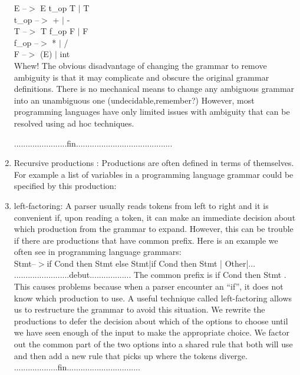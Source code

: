 \begin{enumerate}
E $–>$ E t\_op T $|$ T\\
t\_op $–>$ + $|$ -\\
T $–>$ T f\_op F $|$ F\\
f\_op $–>$ * $|$ /\\
F $–>$ (E) $|$ int\\

Whew! The obvious disadvantage of changing the grammar to remove ambiguity is that it may complicate and obscure the original grammar definitions. There is no mechanical means to change any ambiguous grammar into an unambiguous one (undecidable,remember?) However, most programming languages have only limited issues with
ambiguity that can be resolved using ad hoc techniques.

.......................fin..........................................


\item Recursive productions :
Productions are often defined in terms of themselves. For example a list of variables in a programming language grammar could be specified by this production:

\item left-factoring:  A parser usually reads tokens from left to right and it is convenient if, upon reading a token, it can make an immediate decision about which production from the grammar to expand. However, this can be trouble if there are productions that have common prefix. Here is an example we often see in programming language grammars:\\










Stmt–$>$if Cond then Stmt else Stmt|if Cond then Stmt | Other|...\\

........................debut..................
The common prefix is if Cond then Stmt . This causes problems because when a parser encounter an “if”, it does not know which production to use. A useful technique called left-factoring allows us to restructure the grammar to avoid this situation. We rewrite the productions to defer the decision about which of the options to choose until we have seen enough of the input to make the appropriate choice. We factor out the common part of the two options into a shared rule that both will use and then add a new rule that picks up where the tokens diverge.
...................fin................................



\end{enumerate}
